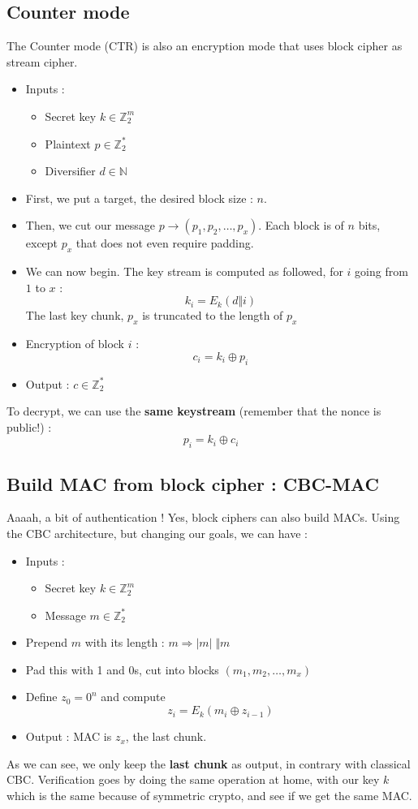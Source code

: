 \documentclass[../Cryptography.tex]{subfiles}
\begin{document}
\subsection{Counter mode}
The Counter mode (CTR) is also an encryption mode that uses block cipher as stream cipher.
\begin{itemize}
    \item Inputs : 
    \begin{itemize}[label = $\cdot$]
        \item Secret key $k \in \mathbb{Z}_2 ^m$
        \item Plaintext $p \in \mathbb{Z}_2 ^*$
        \item Diversifier $d \in \mathbb{N}$
    \end{itemize}
    \item First, we put a target, the desired block size : $n$.
    \item Then, we cut our message $p \longrightarrow (p_1, p_2, \dots, p_x)$. Each block is of $n$ bits, except $p_x$ that does not even require padding.
    \item We can now begin. The key stream is computed as followed, for $i$ going from $1$ to $x$ :
    $$k_i = E_k(d\Vert i)$$
    The last key chunk, $p_x$ is truncated to the length of $p_x$
    \item Encryption of block $i$ :
    $$c_i = k_i  \oplus p_i$$
    \item Output : $c \in \mathbb{Z}_2 ^*$
\end{itemize}
To decrypt, we can use the \textbf{same keystream} (remember that the nonce is public!) :
$$p_i = k_i \oplus c_i$$

\subsection{Build MAC from block cipher : CBC-MAC}
Aaaah, a bit of authentication ! Yes, block ciphers can also build MACs. Using the CBC architecture, but changing our goals, we can have :
\begin{itemize}
    \item Inputs :
    \begin{itemize}
        \item Secret key $k \in \mathbb{Z}_2 ^m$
        \item Message $m \in \mathbb{Z}_2 ^*$
    \end{itemize}
    \item Prepend $m$ with its length : $m \Rightarrow |m| \; \Vert m$
    \item Pad this with 1 and 0s, cut into blocks $(m_1, m_2, \dots, m_x)$
    \item Define $z_0 = 0 ^n$ and compute
    $$z_i = E_k(m_i \oplus z_{i-1})$$
    \item Output : MAC is $z_x$, the last chunk.
\end{itemize}
As we can see, we only keep the \textbf{last chunk} as output, in contrary with classical CBC. Verification goes by doing the same operation at home, with our key $k$ which is the same because of symmetric crypto, and see if we get the same MAC.
\end{document}
